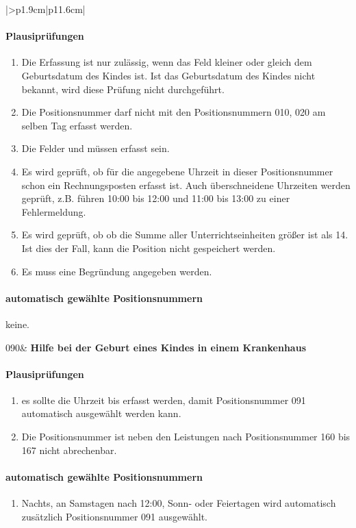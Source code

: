 \begin{mpsupertabular}{|>{\centering}p{1.9cm}|p{11.6cm}|}
\paragraph{Plausiprüfungen}
\begin{enumerate}
\item
Die Erfassung ist nur zulässig, wenn das Feld  kleiner 
oder gleich dem Geburtsdatum des Kindes ist. Ist das Geburtsdatum des
Kindes nicht bekannt, wird diese Prüfung nicht durchgeführt.
\item
Die Positionsnummer darf nicht mit den Positionsnummern 010, 020 am
selben Tag erfasst werden.
\item
Die Felder  und  müssen erfasst sein.
\item
Es wird geprüft, ob für die angegebene Uhrzeit in dieser Positionsnummer
schon ein Rechnungsposten erfasst ist. Auch überschneidene Uhrzeiten
werden geprüft, z.B. führen 10:00 bis 12:00 und 11:00 bis 13:00 zu einer
Fehlermeldung.
\item
Es wird geprüft, ob ob die Summe aller Unterrichtseinheiten größer
ist als 14. Ist dies der Fall, kann die Position nicht gespeichert
werden.
\item
Es muss eine Begründung angegeben werden.
\end{enumerate}
\paragraph{automatisch gewählte Positionsnummern}
keine.
\\ \hline


090&
\textbf{Hilfe bei der Geburt eines Kindes in einem Krankenhaus}
\paragraph{Plausiprüfungen}
\begin{enumerate}
\item
es sollte die Uhrzeit bis erfasst werden, damit Positionsnummer 091 
automatisch ausgewählt werden kann.
\item
Die Positionsnummer ist neben den Leistungen nach Positionsnummer 160 bis
167 nicht abrechenbar.
\end{enumerate}
\paragraph{automatisch gewählte Positionsnummern}
\begin{enumerate}
\item
Nachts, an Samstagen nach 12:00, Sonn- oder Feiertagen wird automatisch 
zusätzlich Positionsnummer 091 ausgewählt.
\end{enumerate}
\\ \hline



\end{mpsupertabular}
